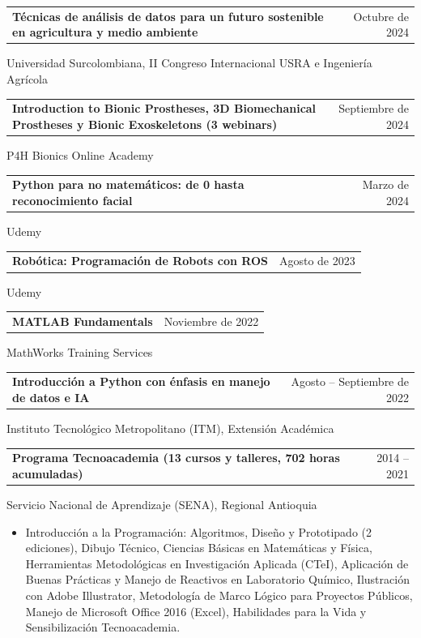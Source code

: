 \documentclass[10pt, letterpaper]{article}
\makeatletter
\newcommand{\ItemCV}[2]{%
  \par\noindent\begin{tabularx}{\linewidth}{@{}X r@{}}
    {\FuenteTitulo\normalsize\color{GrisPizarra}\bfseries #1} &
    {\FuenteCodigo\small\color{GrisMedio}#2}\\
  \end{tabularx}\par\vspace{0.1em}%
}
\makeatother
\begin{document}
\vspace{0.5em}

\ItemCV{Técnicas de análisis de datos para un futuro sostenible en agricultura y medio ambiente}{Octubre de 2024}
Universidad Surcolombiana, II Congreso Internacional USRA e Ingeniería Agrícola

\vspace{0.5em}

\ItemCV{Introduction to Bionic Prostheses, 3D Biomechanical Prostheses y Bionic Exoskeletons (3 webinars)}{Septiembre de 2024}
P4H Bionics Online Academy

\vspace{0.5em}

\ItemCV{Python para no matemáticos: de 0 hasta reconocimiento facial}{Marzo de 2024}
Udemy

\vspace{0.5em}

\ItemCV{Robótica: Programación de Robots con ROS}{Agosto de 2023}
Udemy

\vspace{0.5em}

\ItemCV{MATLAB Fundamentals}{Noviembre de 2022}
MathWorks Training Services

\vspace{0.5em}

\ItemCV{Introducción a Python con énfasis en manejo de datos e IA}{Agosto -- Septiembre de 2022}
Instituto Tecnológico Metropolitano (ITM), Extensión Académica

\vspace{0.5em}

\ItemCV{Programa Tecnoacademia (13 cursos y talleres, 702 horas acumuladas)}{2014 -- 2021}
Servicio Nacional de Aprendizaje (SENA), Regional Antioquia
\begin{itemize}
  \item{} Introducción a la Programación: Algoritmos, Diseño y Prototipado
        (2 ediciones), Dibujo Técnico, Ciencias Básicas en Matemáticas y
        Física, Herramientas Metodológicas en Investigación Aplicada (CTeI),
        Aplicación de Buenas Prácticas y Manejo de Reactivos en Laboratorio
        Químico, Ilustración con Adobe Illustrator, Metodología de Marco
        Lógico para Proyectos Públicos, Manejo de Microsoft Office 2016
        (Excel), Habilidades para la Vida y Sensibilización Tecnoacademia.
\end{itemize}
\end{document}
